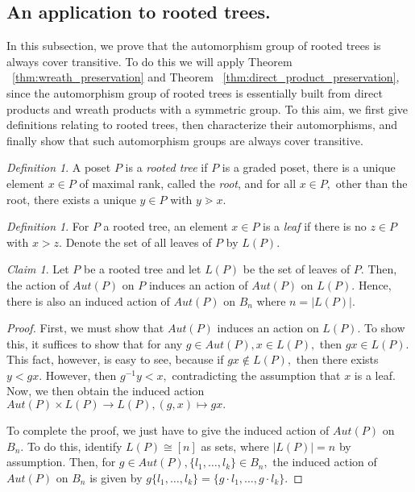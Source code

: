 \documentclass{amsart}
\theoremstyle{remark}
\newtheorem{defn}[thm]{Definition}
\newtheorem{claim}[thm]{Claim}
\newcommand\ssec{\subsection}
\begin{document}
\ssec{An application to rooted trees.}
In this subsection, we prove that the automorphism group of rooted trees is always cover transitive. To do this we will apply Theorem ~\ref{thm:wreath_preservation} and Theorem ~\ref{thm:direct_product_preservation}, since the automorphism group of rooted trees is essentially built from direct products and wreath products with a symmetric group. To this aim, we first give definitions relating to rooted trees, then characterize their automorphisms, and finally show that such automorphism groups are always cover transitive.

\begin{defn}
A poset $P$ is a {\it rooted tree} if $P$ is a graded poset, there is a unique element $x \in P$ of maximal rank, called the {\it root}, and for all $x \in P,$ other than the root, there exists a unique $y \in P$ with $y \gtrdot x.$
\end{defn}

\begin{defn}
For $P$ a rooted tree, an element $x \in P$ is a {\it leaf} if there is no $z \in P$ with $x > z.$ Denote the set of all leaves of $P$ by $L(P).$
\end{defn}

\begin{claim}
\label{claim:induced_tree_action}
Let $P$ be a rooted tree and let $L(P)$ be the set of leaves of $P.$ Then, the action of $Aut(P)$ on $P$ induces an action of $Aut(P)$ on $L(P).$ Hence, there is also an induced action of $Aut(P)$ on $B_n$ where $n = |L(P)|.$ 
\end{claim}
\begin{proof}
First, we must show that $Aut(P)$ induces an action on $L(P).$ To show this, it suffices to show that for any $g \in Aut(P),x \in L(P),$ then $gx \in L(P).$ This fact, however, is easy to see, because if $gx \notin L(P),$ then there exists $y < gx.$ However, then $g^{-1}y < x,$ contradicting the assumption that $x$ is a leaf. Now, we then obtain the induced action $Aut(P)\times L(P) \rightarrow L(P),(g,x)\mapsto gx.$

To complete the proof, we just have to give the induced action of $Aut(P)$ on $B_n.$ To do this, identify $L(P) \cong [n]$ as sets, where $|L(P)| = n$ by assumption. Then, for $g \in Aut(P),\{l_1,\ldots, l_k\} \in B_n,$ the induced action of $Aut(P)$ on $B_n$ is given by $g\{l_1,\ldots, l_k\} = \{g\cdot l_1,\ldots, g\cdot l_k\}.$
\end{proof}
\end{document}
